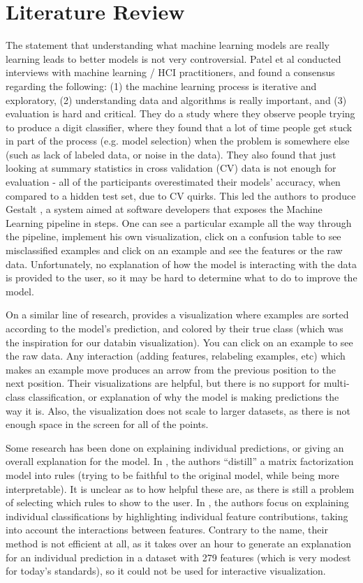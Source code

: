\documentclass{chi2009}
\begin{document}
\section{Literature Review}
The statement that understanding what machine learning models are really
learning leads to better models is not very controversial.  Patel et al
\cite{Patel:2008:ISM:1357054.1357160} conducted interviews with machine learning
/ HCI practitioners, and found a consensus regarding the following: (1) the
machine learning process is iterative and exploratory, (2) understanding data
and algorithms is really important, and (3) evaluation is hard and critical.
They do a study where they observe people trying to produce a digit classifier,
where they found that a lot of time people get stuck in part of the process
(e.g. model selection) when the problem is somewhere else (such as lack of
labeled data, or noise in the data). They also found that just looking at
summary statistics in cross validation (CV) data is not enough for evaluation -
all of the participants overestimated their models’ accuracy, when compared to a
hidden test set, due to CV quirks. This led the authors to produce Gestalt
\cite{gestalt}, a system aimed at software developers that exposes the Machine
Learning pipeline in steps. One can see a particular example all the way through
the pipeline, implement his own visualization, click on a confusion table to see
misclassified examples and click on an example and see the features or the raw
data. Unfortunately, no explanation of how the model is interacting with the
data is provided to the user, so it may be hard to determine what to do to
improve the model.

On a similar line of research, \cite{modeltracker} provides a
visualization where examples are sorted according to the model's prediction, and
colored by their true class (which was the inspiration for our databin
visualization). You can click on an example to see the raw data. Any interaction
(adding features, relabeling examples, etc) which makes an example move produces
an arrow from the previous position to the next position. Their visualizations
are helpful, but there is no support for multi-class classification, or
explanation of why the model is making predictions the way it is. Also, the
visualization does not scale to larger datasets, as there is not enough space in
the screen for all of the points.

Some research has been done on explaining individual predictions, or giving an
overall explanation for the model. In \cite{explain:krr15}, the authors
``distill'' a matrix factorization model into rules (trying to be faithful to
the original model, while being more interpretable). It is unclear as to how
helpful these are, as there is still a problem of selecting which rules to show
to the user. In \cite{Strumbelj:2010:EEI:1756006.1756007}, the authors focus on
explaining individual classifications by highlighting individual feature
contributions, taking into account the interactions between features. Contrary
to the name, their method is not efficient at all, as it takes over an hour to
generate an explanation for an individual prediction in a dataset with 279
features (which is very modest for today's standards), so it could not be used
for interactive visualization.
\end{document}
